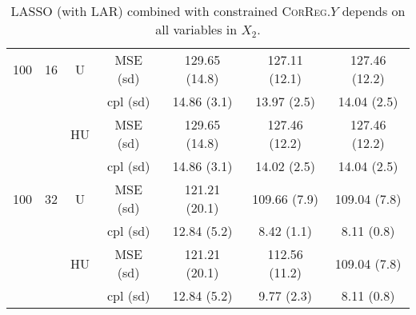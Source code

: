 \documentclass[11pt,a4paper]{article}
\begin{document}
\begin{table}[h!]
\begin{tabular}{|c|c|c|c|c|c|c|}
\hline
\hline %
100 & 16 & U& MSE (sd) & 129.65 (14.8) & 127.11 (12.1) & 127.46 (12.2) \\
& & &  cpl (sd) & 14.86 (3.1) & 13.97 (2.5) & 14.04 (2.5) \\
 &  &HU &  MSE (sd) & 129.65 (14.8) & 127.46 (12.2) & 127.46 (12.2) \\
& & & cpl (sd) & 14.86 (3.1) & 14.02 (2.5) & 14.04 (2.5) \\
\hline %
100 & 32 & U&  MSE (sd) & 121.21 (20.1) & 109.66 (7.9) & 109.04 (7.8) \\
& & & cpl (sd) & 12.84 (5.2) & 8.42 (1.1) & 8.11 (0.8) \\
 &  &HU &  MSE (sd) & 121.21 (20.1) & 112.56 (11.2) & 109.04 (7.8) \\
& & & cpl (sd) & 12.84 (5.2) & 9.77 (2.3) & 8.11 (0.8) \\
\hline
\end{tabular} 
\caption{LASSO (with LAR) combined with constrained \textsc{CorReg}.$Y$  depends on all variables in $X_2$. }\label{YX2linLASSO}
\end{table}
\end{document}
